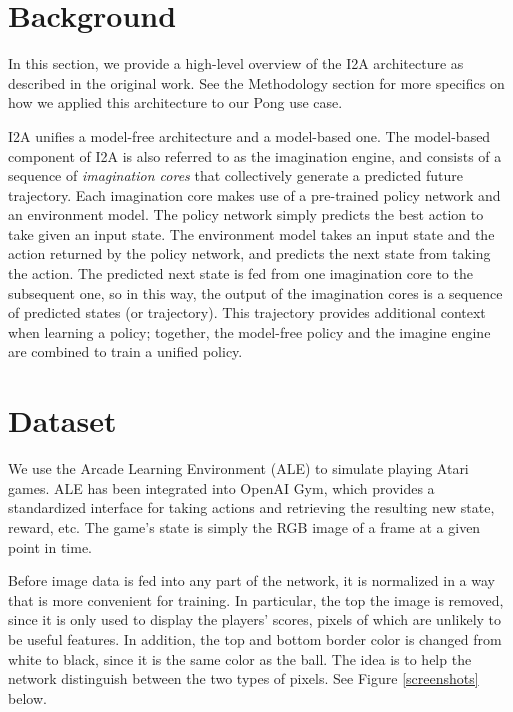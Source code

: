 \documentclass[10pt, twocolumn]{article}
\begin{document}
\section{Background}

In this section, we provide a high-level overview of the I2A architecture as described in the original work. See the Methodology section for more specifics on how we applied this architecture to our Pong use case.

I2A unifies a model-free 
architecture and a model-based one. The model-based component of I2A is also referred to as the imagination engine, and consists of a 
sequence of \emph{imagination cores} that collectively generate a predicted future trajectory. Each imagination core makes use of a pre-trained policy network and an environment model. The policy network simply predicts the best action to take given an input state. The environment model takes an input state and the action returned by the policy network, and predicts the next state from taking the action. The predicted next state is fed from one imagination core to the subsequent one, so in this way, the output of the imagination cores is a sequence of predicted states (or trajectory). This trajectory provides additional context when learning a policy; together, the model-free policy and the imagine engine are combined to train a unified policy.

\section{Dataset}
We use the Arcade Learning Environment (ALE) to simulate playing Atari games. ALE has been integrated
into OpenAI Gym, which provides a standardized interface for taking actions and retrieving the resulting new
state, reward, etc. The game's state is simply the RGB image of a frame at a given point in time.

Before image data is fed into any part of the network, it is normalized in a way that is more convenient for training.
In particular, the top the image is removed, since it is only used to display the players' scores, pixels of which are
unlikely to be useful features. In addition, the top and bottom border color is changed from white to black, since
it is the same color as the ball. The idea is to help the network distinguish between the two types of pixels.
See Figure \ref{screenshots} below.
\end{document}
